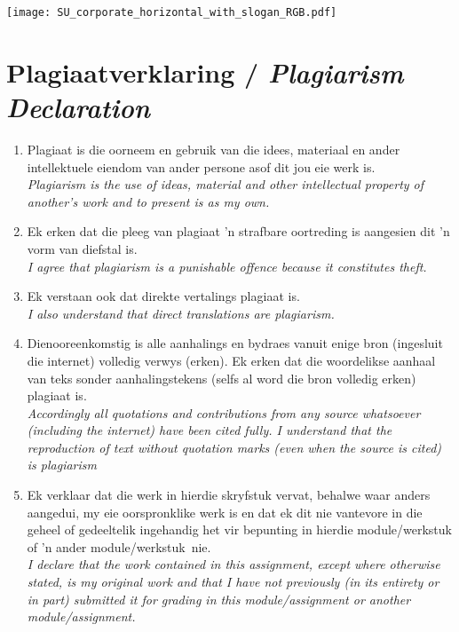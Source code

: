 \newpage
\thispagestyle{plain}
\makeatletter{}\makeatother

\centerline{\texttt{[image: SU\_corporate\_horizontal\_with\_slogan\_RGB.pdf]}}
\vspace*{-25pt}

\section*{\centering Plagiaatverklaring / \textit{Plagiarism Declaration}}

\vspace*{5pt}

\begin{enumerate}
    \item Plagiaat is die oorneem en gebruik van die idees, materiaal en ander intellektuele eiendom van ander persone asof dit jou eie werk is.\\
    \textit{Plagiarism is the use of ideas, material and other intellectual property of another's work
        and to present is as my own.}
    
    \item Ek erken dat die pleeg van plagiaat 'n strafbare oortreding is aangesien dit 'n vorm van diefstal is.\\
    \textit{I agree that plagiarism is a punishable offence because it constitutes theft.}
    
    \item Ek verstaan ook dat direkte vertalings plagiaat is. \\
    \textit{I also understand that direct translations are plagiarism.}
    
    \item Dienooreenkomstig is alle aanhalings en bydraes vanuit enige bron (ingesluit die internet) volledig verwys (erken). Ek erken dat die woordelikse aanhaal van teks sonder aanhalingstekens (selfs al word die bron volledig erken) plagiaat is. \\
    \textit{Accordingly all quotations and contributions from any source whatsoever (including the internet) have been cited fully. I understand that the reproduction of text without quotation marks (even when the source is cited) is plagiarism}
    
    \item Ek verklaar dat die werk in hierdie skryfstuk vervat, behalwe waar anders aangedui, my eie oorspronklike werk is en dat ek dit nie vantevore in die geheel of gedeeltelik ingehandig het vir bepunting in hierdie module/werkstuk of 'n ander module/werkstuk~nie. \\
    \textit{I declare that the work contained in this assignment, except where otherwise stated, is my original work and that I have not previously (in its entirety or in part) submitted it for grading in this module/assignment or another module/assignment.}
\end{enumerate}

